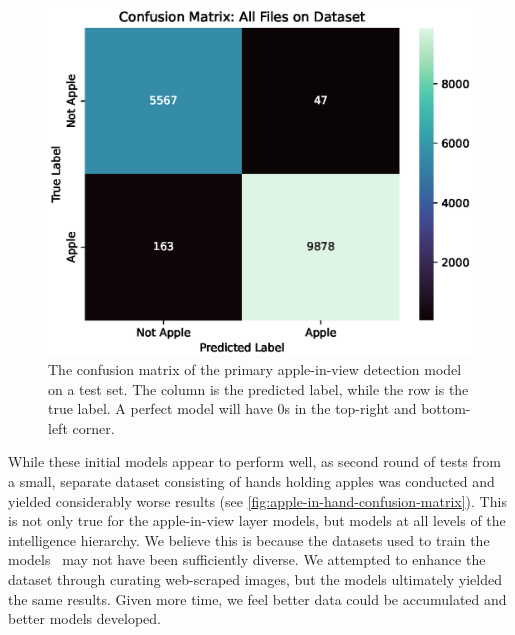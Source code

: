 \begin{figure}[!htb]
    \centering
    \includegraphics[width=\columnwidth,keepaspectratio]
    {./figures/confusion_matrix_All_Files_on_Dataset}
    \caption{
        The confusion matrix of the primary apple-in-view detection model on a test set.
        The column is the predicted label, while the row is the true label.
        A perfect model will have 0s in the top-right and bottom-left corner.
    }
    \label{fig:apple-in-view-confusion-matrix}
\end{figure}

While these initial models appear to perform well, as second round of tests from a small, separate dataset consisting of hands holding apples was conducted and yielded considerably worse results (see \autoref{fig:apple-in-hand-confusion-matrix}).
This is not only true for the apple-in-view layer models, but models at all levels of the intelligence hierarchy.
We believe this is because the datasets used to train the models~\cite{Fruit360,Sultana2022} may not have been sufficiently diverse.
We attempted to enhance the dataset through curating web-scraped images, but the models ultimately yielded the same results.
Given more time, we feel better data could be accumulated and better models developed.

